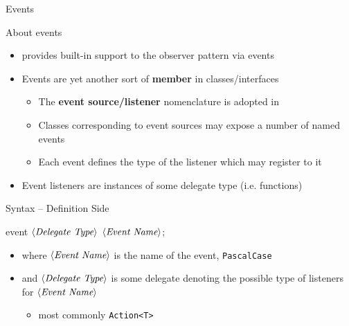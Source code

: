 \documentclass[presentation]{beamer}
\newcommand{\cscat}[1]{$\langle\text{{\itshape#1}}\rangle$}
\begin{document}
\begin{frame}[allowframebreaks]{\dotnet Events}
  \begin{block}{About \dotnet events}
    \begin{itemize}
      \item \dotnet provides \alert{built-in support} to the \alert{observer pattern} via \alert{events}
      
      \item Events are yet another sort of \textbf{member} in \dotnet classes/interfaces
      \begin{itemize}
      \item The \textbf{event source/listener} nomenclature is adopted in \dotnet
      \item Classes corresponding to event sources may expose a number of named events
      \item Each event defines the type of the listener which may register to it
      \end{itemize}
      \item Event listeners are instances of some delegate type (i.e. functions)
    \end{itemize}
  \end{block}

  \begin{block}{Syntax -- Definition Side}
    \begin{center}\ttfamily
      event \cscat{Delegate Type} \cscat{Event Name};
    \end{center}
    \begin{itemize}
      \item where \texttt{\cscat{Event Name}} is the name of the event, \texttt{PascalCase}
      \item and \texttt{\cscat{Delegate Type}} is some delegate denoting the possible type of listeners for \texttt{\cscat{Event Name}}
      \begin{itemize}
        \item most commonly \texttt{Action<T>}
      \end{itemize}
    \end{itemize}
  \end{block}


\end{frame}
\end{document}
